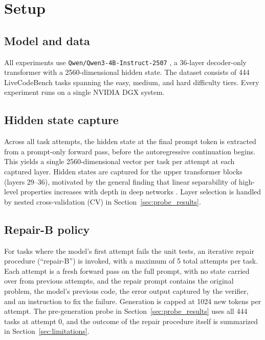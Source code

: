 \section{Setup}
\label{sec:setup}

\subsection{Model and data}

All experiments use \texttt{Qwen/Qwen3-4B-Instruct-2507} \citep{qwen3report2025}, a 36-layer decoder-only transformer with a 2560-dimensional hidden state. The dataset consists of 444 LiveCodeBench \citep{jain2024livecodebench} tasks spanning the easy, medium, and hard difficulty tiers. Every experiment runs on a single NVIDIA DGX system.

\subsection{Hidden state capture}

Across all task attempts, the hidden state at the final prompt token is extracted from a prompt-only forward pass, before the autoregressive continuation begins. This yields a single 2560-dimensional vector per task per attempt at each captured layer. Hidden states are captured for the upper transformer blocks (layers 29--36), motivated by the general finding that linear separability of high-level properties increases with depth in deep networks \citep{alain2016probes}. Layer selection is handled by nested cross-validation (CV) in Section~\ref{sec:probe_results}.

\subsection{Repair-B policy}

For tasks where the model's first attempt fails the unit tests, an iterative repair procedure (``repair-B'') is invoked, with a maximum of 5 total attempts per task. Each attempt is a fresh forward pass on the full prompt, with no state carried over from previous attempts, and the repair prompt contains the original problem, the model's previous code, the error output captured by the verifier, and an instruction to fix the failure. Generation is capped at 1024 new tokens per attempt. The pre-generation probe in Section~\ref{sec:probe_results} uses all 444 tasks at attempt 0, and the outcome of the repair procedure itself is summarized in Section~\ref{sec:limitations}.
